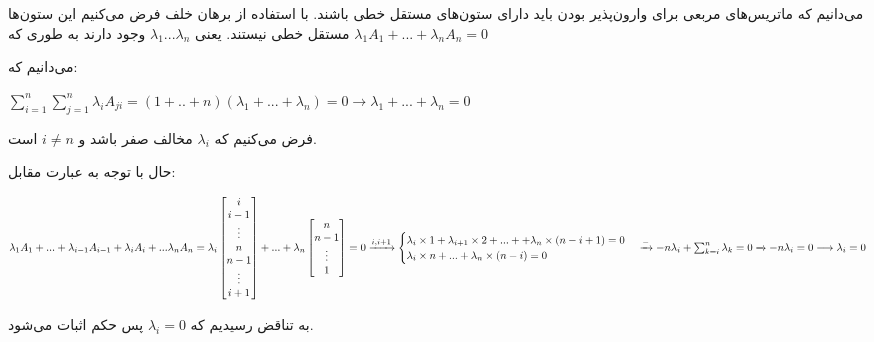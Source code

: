 می‌دانیم که ماتریس‌های مربعی برای وارون‌پذیر بودن باید دارای ستون‌های مستقل خطی باشند. با استفاده از برهان خلف فرض می‌کنیم این ستون‌ها مستقل خطی نیستند. یعنی 
$\lambda_1 ... \lambda_n$
وجود دارند به طوری که 
$\lambda_1A_1 + ... + \lambda_nA_n = 0$


می‌دانیم که:

\setLTR
$
\sum_{i=1}^{n}\sum_{j=1}^{n} \lambda_iA_{ji} = (1+..+n)(\lambda_1+...+\lambda_n)=0\longrightarrow
\lambda_1+...+\lambda_n = 0
$
\setRTL

فرض می‌کنیم که 
$\lambda_i$
مخالف صفر باشد و 
$i \neq n$
است.

حال با توجه به عبارت مقابل:

\setLTR
$
\lambda_1A_1+...+\lambda_{i-1}A_{i-1}+\lambda_{i}A_i+...\lambda_nA_n = \lambda_i
\begin{bmatrix}
	i \\
	i-1 \\
	\vdots \\
	n \\
	n-1 \\
	\vdots \\
	i +1 \\
\end{bmatrix} + ... + \lambda_n
\begin{bmatrix}
	n \\
	n-1 \\
	\vdots \\
	1
\end{bmatrix} = 0 \\ \xrightarrow{i , i+1} \begin{cases}
\lambda_i \times 1 + \lambda_{i+1} \times 2 + ... + + \lambda_{n} \times (n-i+1) = 0 \\
\lambda_i \times n +...+ \lambda_{n} \times (n-i) = 0
\end{cases} \xrightarrow{-} -n\lambda_i + \sum_{k=i}^{n} \lambda_k = 0 \xrightarrow{} -n\lambda_i =0 \\ \longrightarrow \lambda_i = 0
$
\setRTL


به تناقض رسیدیم که 
$\lambda_i = 0$
پس حکم اثبات می‌شود.